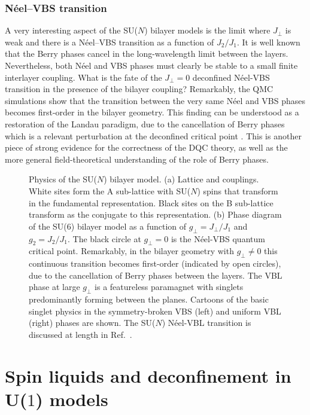 \documentclass[range]{ar2e}
\begin{document}
\subsubsection{N\'eel--VBS transition}
A very interesting aspect of the SU($N$) bilayer models is the limit where $J_\perp$ is weak and there is a N\'eel--VBS transition as a function of $J_2/J_1$.
It is well known that the Berry phases cancel in the long-wavelength limit between the layers. Nevertheless, both N\'eel and VBS phases must clearly be stable 
to a small finite interlayer coupling. What is the fate of the $J_\perp=0$ deconfined N\'eel-VBS transition in the presence of the bilayer coupling? Remarkably, 
the QMC simulations show that the transition between the very same N\'eel and VBS phases becomes first-order in the bilayer geometry. This finding can be 
understood as a restoration of the Landau paradigm, due to the cancellation of Berry phases which is a relevant perturbation at the deconfined critical 
point \cite{kaul2012:sun_bil}. This is another piece of strong evidence for the correctness of the DQC theory, as well as the more general field-theoretical 
understanding of the role of Berry phases.

\begin{figure}
\centerline{}
  \caption{ \label{fig:pd_bil}  Physics of the SU($N$) bilayer model.  (a) Lattice and couplings. White sites form the A sub-lattice with 
  SU($N$) spins that transform in the fundamental representation. Black sites on the B sub-lattice transform as the conjugate to this representation. (b) Phase diagram of the
  SU($6$) bilayer model as a function of $g_\perp =J_\perp/J_1$ and $g_2=J_2/J_1$. The black circle at $g_\perp=0$ is the N\'eel-VBS quantum critical point. Remarkably, 
  in the bilayer geometry with $g_\perp\neq 0$ this continuous transition becomes first-order (indicated by open circles), due to the cancellation of Berry phases between 
  the layers. The VBL phase at large $g_\perp$ is a featureless paramagnet with singlets predominantly forming between the planes. Cartoons of the basic singlet physics 
  in the symmetry-broken VBS (left) and uniform VBL (right) phases are shown. The SU($N$) N\'eel-VBL transition is discussed at length in Ref.~\cite{kaul2012:sun_bil}.}
\end{figure}

\section{Spin liquids and deconfinement in U($1$) models}
\label{sec:u1models}
\end{document}
